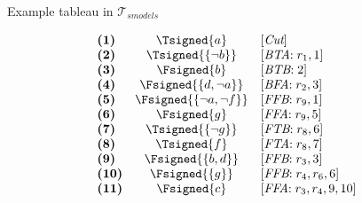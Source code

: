 \begin{frame}{Example tableau in $\mathcal{T}_{\textit{smodels}}$}
\TableauExampleProgram
\begin{center}
\begin{minipage}[t]{16cm}
\tiny
\begin{minipage}[t]{4.5cm}
\[
\hspace{-0.2cm}
\begin{array}{lcl}
\textbf{(1)}                                       &
  \Tsigned{a}                                      &
  [\textit{Cut}]                                   \\
\textbf{(2)}                                       &
  \Tsigned{\{\neg b\}}                     &
  [\textit{BTA}{:}\; r_1, \text{1}]                \\
\textbf{(3)}                                       &
  \Fsigned{b}                                      &
  [\textit{BTB}{:}\; \text{2}]                     \\
\textbf{(4)}                                       &
  \Fsigned{\{d,\neg a\}}                   &
  [\textit{BFA}{:}\;r_2, \text{3}]                 \\
\textbf{(5)}                                       &
  \Fsigned{\{\neg a,\neg f\}}      &
  [\textit{FFB}{:}\;r_9, \text{1}]                 \\
\textbf{(6)}                                       &
  \Fsigned{g}                                      &
  [\textit{FFA}{:}\;r_9, \text{5}]                 \\
\textbf{(7)}                                       &
  \Tsigned{\{\neg g\}}                     &
  [\textit{FTB}{:}\;r_8, \text{6}]                 \\
\textbf{(8)}                                       &
  \Tsigned{f}                                      &
  [\textit{FTA}{:}\;r_8, \text{7}]                 \\
\textbf{(9)}                                       &
  \Fsigned{\{b,d\}}                                &
  [\textit{FFB}{:}\;r_3, \text{3}]                 \\
\textbf{(10)}                                      &
  \Fsigned{\{g\}}                                  &
  [\textit{FFB}{:}\;r_4, r_6, \text{6}]            \\
\textbf{(11)}                                      &
  \Fsigned{c}                                      &
  [\textit{FFA}{:}\;r_3,r_4, \text{9}, \text{10}]  \\

\end{array}\]
\end{minipage}
\end{minipage}
\end{center}
\end{frame}
